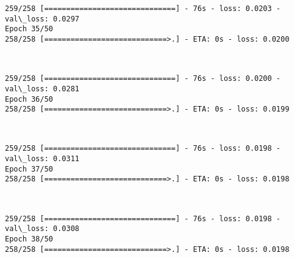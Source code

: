 \documentclass[11pt]{article}
\begin{document}
    \begin{Verbatim}[commandchars=\\\{\}]
259/258 [==============================] - 76s - loss: 0.0203 - val\_loss: 0.0297
Epoch 35/50
258/258 [============================>.] - ETA: 0s - loss: 0.0200
    \end{Verbatim}

    \begin{center}
    \end{center}
    { \hspace*{\fill} \\}
    
    \begin{Verbatim}[commandchars=\\\{\}]
259/258 [==============================] - 76s - loss: 0.0200 - val\_loss: 0.0281
Epoch 36/50
258/258 [============================>.] - ETA: 0s - loss: 0.0199
    \end{Verbatim}

    \begin{center}
    \end{center}
    { \hspace*{\fill} \\}
    
    \begin{Verbatim}[commandchars=\\\{\}]
259/258 [==============================] - 76s - loss: 0.0198 - val\_loss: 0.0311
Epoch 37/50
258/258 [============================>.] - ETA: 0s - loss: 0.0198
    \end{Verbatim}

    \begin{center}
    \end{center}
    { \hspace*{\fill} \\}
    
    \begin{Verbatim}[commandchars=\\\{\}]
259/258 [==============================] - 76s - loss: 0.0198 - val\_loss: 0.0308
Epoch 38/50
258/258 [============================>.] - ETA: 0s - loss: 0.0198
    \end{Verbatim}

    \begin{center}
    \end{center}
    { \hspace*{\fill} \\}
    
\end{document}
